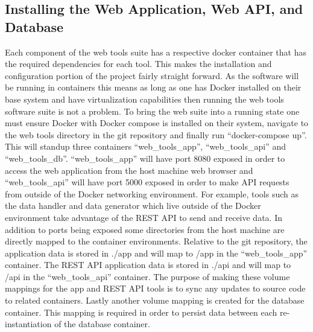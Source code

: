 \documentclass[onecolumn, draftclsnofoot,10pt, compsoc]{IEEEtran}
\begin{document}
\subsection{Installing the Web Application, Web API, and Database}
Each component of the web tools suite has a respective docker container that has the required dependencies for each tool. This makes the installation and configuration portion of the project fairly straight forward. As the software will be running in containers this means as long as one has Docker installed on their base system and have virtualization capabilities then running the web tools software suite is not a problem. To bring the web suite into a running state one must ensure Docker with Docker compose is installed on their system, navigate to the web tools directory in the git repository and finally run “docker-compose up”. This will standup three containers “web\_tools\_app”, “web\_tools\_api” and “web\_tools\_db”. “web\_tools\_app” will have port 8080 exposed in order to access the web application from the host machine web browser and “web\_tools\_api” will have port 5000 exposed in order to make API requests from outside of the Docker networking environment. For example, tools such as the data handler and data generator which live outside of the Docker environment take advantage of the REST API to send and receive data. In addition to ports being exposed some directories from the host machine are directly mapped to the container environments. Relative to the git repository, the application data is stored in ./app and will map to /app in the “web\_tools\_app” container. The REST API application data is stored in ./api and will map to /api in the “web\_tools\_api” container. The purpose of making these volume mappings for the app and REST API tools is to sync any updates to source code to related containers. Lastly another volume mapping is created for the database container. This mapping is required in order to persist data between each re-instantiation of the database container. 
\end{document}
